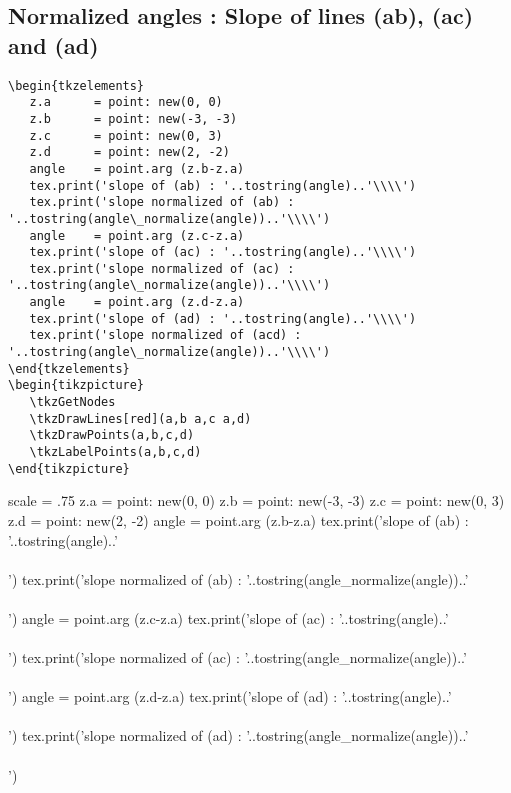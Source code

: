 \subsection{Normalized angles : Slope of lines (ab), (ac) and (ad)} %
\label{sub:normalized_angles}
\begin{Verbatim}
\begin{tkzelements}
   z.a      = point: new(0, 0)
   z.b      = point: new(-3, -3)
   z.c      = point: new(0, 3)
   z.d      = point: new(2, -2)
   angle    = point.arg (z.b-z.a)
   tex.print('slope of (ab) : '..tostring(angle)..'\\\\')
   tex.print('slope normalized of (ab) : '..tostring(angle\_normalize(angle))..'\\\\')
   angle    = point.arg (z.c-z.a)
   tex.print('slope of (ac) : '..tostring(angle)..'\\\\')
   tex.print('slope normalized of (ac) : '..tostring(angle\_normalize(angle))..'\\\\')
   angle    = point.arg (z.d-z.a)
   tex.print('slope of (ad) : '..tostring(angle)..'\\\\')
   tex.print('slope normalized of (acd) : '..tostring(angle\_normalize(angle))..'\\\\')
\end{tkzelements}
\begin{tikzpicture}
   \tkzGetNodes
   \tkzDrawLines[red](a,b a,c a,d)
   \tkzDrawPoints(a,b,c,d)
   \tkzLabelPoints(a,b,c,d)
\end{tikzpicture}
\end{Verbatim}
\begin{tkzelements}
  scale = .75
z.a = point: new(0, 0)
z.b = point: new(-3, -3)
z.c = point: new(0, 3)
z.d = point: new(2, -2)
angle = point.arg (z.b-z.a)
tex.print('slope of (ab) : '..tostring(angle)..'\\\\')
tex.print('slope normalized of (ab) : '..tostring(angle_normalize(angle))..'\\\\')
angle = point.arg (z.c-z.a)
tex.print('slope of (ac) : '..tostring(angle)..'\\\\')
tex.print('slope normalized of (ac) : '..tostring(angle_normalize(angle))..'\\\\')
angle = point.arg (z.d-z.a)
tex.print('slope of (ad) : '..tostring(angle)..'\\\\')
tex.print('slope normalized of (ad) : '..tostring(angle_normalize(angle))..'\\\\')
\end{tkzelements}

